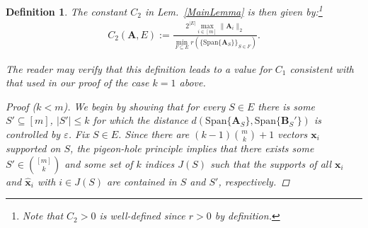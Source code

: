 \documentclass[9pt,twocolumn]{pnas-new}
\newtheorem{definition}{Definition}
\begin{document}
\begin{definition}
The constant $C_2$ in Lem.~\ref{MainLemma} is then given by:\footnote{Note that $C_2 > 0$ is well-defined since $r > 0$ by definition.}
\begin{align}
C_2(\mathbf{A}, E) := \frac{ 2^{|E|} \max_{i \in [m]} \|\mathbf{A}_i\|_2}{ \min_{F \subseteq E} r( \{ \text{Span}\{\mathbf{A}_{S}\} \}_{S \in F}) }.
\end{align}

The reader may verify that this definition leads to a value for $C_1$ consistent with that used in our proof of the case $k=1$ above.

\begin{proof}[Proof ($k < m$)] 

We begin by showing that for every $S \in E$ there is some $S' \subseteq [m]$, $|S'| \leq k$ for which the distance $d(\text{Span}\{\mathbf{A}_S\}, \text{Span}\{\mathbf{B}_S'\})$ is controlled by $\varepsilon$. Fix $S \in E$. Since there are $(k-1){m \choose k}+1$ vectors $\mathbf{x}_i$ supported on $S$, the pigeon-hole principle implies that there exists some $S' \in {[m] \choose k}$ and some set of $k$ indices $J(S)$ such that the supports of all $\mathbf{x}_i$ and $\mathbf{\hat x}_i$ with $i \in J(S)$ are contained in $S$ and $S'$, respectively.


\end{proof}
\end{definition}
\end{document}
